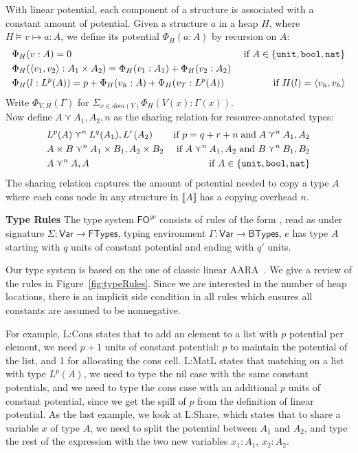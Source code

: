 \documentclass{easychair}
\newcommand{\ms}[1]{\ensuremath{\mathsf{#1}}}
\newcommand{\irl}[1]{\mathtt{#1}}
\newcounter{rule}
\newcommand{\fogc}{\ms{FO}^{gc}}
\theoremstyle{definition}
\begin{document}
With linear potential, each component of a structure is associated with a constant amount of 
potential.  Given a structure $a$ in a heap $H$, where  $H \vDash v \mapsto a : A$, we define 
its potential $\Phi_H(a : A)$ by recursion on $A$: 
%
\begin{align*}
	&\Phi_H(v : A) = 0 &\text{ if } A \in \{\unittycst, \booltyabt, \irl{nat}\}\\
&\Phi_H(\pairexcst{v_1}{v_2} : \prodtycst{A_1}{A_2}) = \Phi_H(v_1 : A_1) + \Phi_H(v_2 : A_2)\\
	&\Phi_H(l : L^p(A)) = p + \Phi_H(v_h : A) + \Phi_H(v_T : L^p(A)) &\text{ if } 
		H(l) = \pairexcst{v_h}{v_h}
\end{align*}
%
Write $\Phi_{V,H}(\Gamma)$ for $\Sigma_{x \in dom(V)} \Phi_H(V(x) : \Gamma(x))$.\\
Now define $A \curlyvee A_1,A_2,n$ as the sharing relation for resource-annotated types:
\begin{align*}
	&L^p(A) \curlyvee^n L^q(A_1),L^r(A_2) & \text{if } p = q + r + n \;\text{and}\; 
			A \curlyvee^n A_1,A_2\\
	&\prodtycst{A}{B} \curlyvee^n \prodtycst{A_1}{B_1}, \prodtycst{A_2}{B_2}
		&\text{ if } A \curlyvee^n A_1,A_2 \text{ and } B \curlyvee^n B_1,B_2\\
	&A \curlyvee^n  A,A& \text{ if } A \in \{\unittycst, \booltycst, \irl{nat}\}
\end{align*}
The sharing relation captures the amount of potential needed to copy a type $A$ where each 
cons node in any structure in $\llbracket A \rrbracket$ has a copying overhead $n$.

\textbf{Type Rules}
\label{sect:typing}
The type system $\fogc$ consists of rules of the form , 
read as under signature $\Sigma : \ms{Var} \to \ms{FTypes}$, 
typing environment $\Gamma : \ms{Var} \to \ms{BTypes}$, $e$ has type $A$ starting with $q$ units of 
constant potential and ending with $q'$ units.

Our type system is based on the one of classic linear AARA~\cite{Jost03}. 
We give a review of the rules in Figure~\ref{fig:typeRules}.
Since we are interested in the number of heap locations, 
there is an implicit side condition in all rules
which ensures all constants are assumed to be nonnegative.
	
For example, L:Cons states that to add an element to a list with $p$ potential per element, 
we need $p+1$ units of constant potential: $p$ to maintain the potential of the list,
and 1 for allocating the cons cell. L:MatL states that matching on a list with type $L^p(A)$,
we need to type the nil case with the same constant potentials, and we need to type
the cons case with an additional $p$ units of constant potential, since we get 
the spill of $p$ from the definition of linear potential. 
As the last example, we look at L:Share, which states that to share 
a variable $x$ of type $A$, we need to split the potential between $A_1$ and $A_2$, and type the 
rest of the expression with the two new variables $x_1: A_1$, $x_2 : A_2$.
\end{document}
